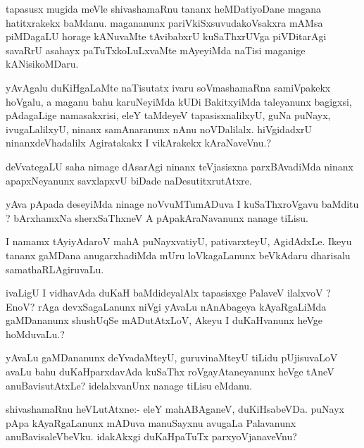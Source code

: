 \documentclass{article}
\begin{document}
\begin{mn}
tapasusx mugida meVle shivashamaRnu tananx heMDatiyoDane magana 
hatitxrakekx baMdanu. magananunx pariVkiSxsuvudakoVsakxra mAMsa piMDagaLU 
horage kANuvaMte tAvibabxrU kuSaThxrUVga piVDitarAgi savaRrU asahayx 
paTuTxkoLuLxvaMte mAyeyiMda naTisi maganige kANisikoMDaru.
\end{mn}

\begin{mn}
yAvAgalu duKiHgaLaMte naTisutatx ivaru soVmashamaRna samiVpakekx hoVgalu,
 a maganu bahu karuNeyiMda kUDi  BakitxyiMda taleyanunx bagigxsi,
  pAdagaLige namasakxrisi, eleY taMdeyeV tapasisxnalilxyU, guNa puNayx,
 ivugaLalilxyU, ninanx samAnaranunx nAnu noVDalilalx. hiVgidadxrU 
 ninanxdeVhadalilx Agiratakakx I vikArakekx kAraNaveVnu.?
\end{mn}

\begin{mn}
deVvategaLU saha nimage dAsarAgi ninanx teVjasisxna parxBAvadiMda 
ninanx apapxNeyanunx savxlapxvU biDade naDesutitxrutAtxre.
\end{mn}

\begin{mn}
yAva pApada deseyiMda ninage noVvuMTumADuva I kuSaThxroVgavu baMditu ?
bArxhamxNa sherxSaThxneV A pApakAraNavanunx nanage tiLisu.
\end{mn}

\begin{mn}
I namamx tAyiyAdaroV mahA puNayxvatiyU, pativarxteyU, AgidAdxLe. Ikeyu 
tananx gaMDana anugarxhadiMda mUru loVkagaLanunx beVkAdaru dharisalu 
samathaRLAgiruvaLu.
\end{mn}

\begin{mn}
ivaLigU I vidhavAda duKaH baMdideyalAlx tapasisxge PalaveV ilalxvoV ?
EnoV? rAga devxSagaLanunx niVgi yAvaLu nAnAbageya kAyaRgaLiMda gaMDananunx 
shushUqSe mADutAtxLoV, Akeyu I duKaHvanunx heVge hoMduvaLu.?
\end{mn}

\begin{mn}
yAvaLu gaMDananunx deYvadaMteyU, guruvinaMteyU tiLidu pUjisuvaLoV avaLu 
bahu duKaHparxdavAda kuSaThx roVgayAtaneyanunx heVge tAneV anuBavisutAtxLe?
idelalxvanUnx nanage tiLisu eMdanu.
\end{mn}

\begin{mn}
shivashamaRnu heVLutAtxne:- eleY mahABAganeV, duKiHsabeVDa. puNayx pApa
kAyaRgaLanunx mADuva manuSayxnu avugaLa Palavanunx anuBavisaleVbeVku. 
idakAkxgi duKaHpaTuTx  parxyoVjanaveVnu?
\end{mn}
\end{document}
